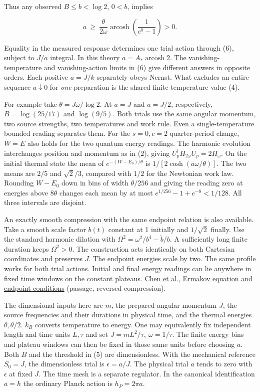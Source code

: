 \documentclass[11pt,a4paper]{article}
\begin{document}
Thus any observed \(B\le b<\log 2\), \(0<b\), implies

\[
 a\ \ge\ \frac{\theta}{2\omega}
       \operatorname{arcosh}\!\left(\frac1{e^b-1}\right)>0.
                                                                    \tag{7}
\]

Equality in the measured response determines one trial action through
(6), subject to \(J/a\) integral. In this theory
\(a=A_*\operatorname{arcosh}2\). The vanishing-temperature and
vanishing-action limits in (6) give different answers in opposite
orders. Each positive \(a=J/k\) separately obeys Nernst. What excludes
an entire sequence \(a\downarrow0\) for \emph{one} preparation is the
shared finite-temperature value (4).

For example take \(\theta=J\omega/\log 2\). At \(a=J\) and \(a=J/2\),
respectively, \(B=\log(25/17)\) and \(\log(9/5)\). Both trials use the
same angular momentum, two source strengths, two temperatures and work
rule. Even a single-temperature bounded reading separates them. For the
\(s=0,c=2\) quarter-period change, \(W=E\) also holds for the two
quantum energy readings. The harmonic evolution interchanges position
and momentum as in (2), giving \(U_p^\dagger H_{2\omega}U_p=2H_\omega\).
On the initial thermal state the mean of \(e^{-(W-E_0)/\theta}\) is
\(1/[2\cosh(a\omega/\theta)]\). The two means are \(2/5\) and
\(\sqrt2/3\), compared with \(1/2\) for the Newtonian work law. Rounding
\(W-E_0\) down in bins of width \(\theta/256\) and giving the reading
zero at energies above \(8\theta\) changes each mean by at most
\(e^{1/256}-1+e^{-8}<1/128\). All three intervals are disjoint.

An exactly smooth compression with the same endpoint relation is also
available. Take a smooth scale factor \(b(t)\) constant at 1 initially
and \(1/\sqrt2\) finally. Use the standard harmonic dilation with
\(\Omega^2=\omega^2/b^4-\ddot b/b\). A sufficiently long finite duration
keeps \(\Omega^2>0\). The construction acts identically on both
Cartesian coordinates and preserves \(J\). The endpoint energies scale
by two. The same profile works for both trial actions. Initial and final
energy readings can lie anywhere in fixed time windows on the constant
plateaus. \href{https://arxiv.org/pdf/0910.0709}{Chen et al., Ermakov
equation and endpoint conditions} (passage, reversed compression).

The dimensional inputs here are \(m\), the prepared angular momentum
\(J\), the source frequencies and their durations in physical time, and
the thermal energies \(\theta,\theta/2\). \(k_B\) converts temperature
to energy. One may equivalently fix independent length and time units
\(L,\tau\) and set \(J=mL^2/\tau,\ \omega=1/\tau\). The finite energy
bins and plateau windows can then be fixed in those same units before
choosing \(a\). Both \(B\) and the threshold in (5) are dimensionless.
With the mechanical reference \(S_0=J\), the dimensionless trial is
\(\epsilon=a/J\). The physical trial \(a\) tends to zero with
\(\epsilon\) at fixed \(J\). The time mesh is a separate regulator. In
the canonical identification \(a=\hbar\) the ordinary Planck action is
\(h_P=2\pi a\).
\end{document}
